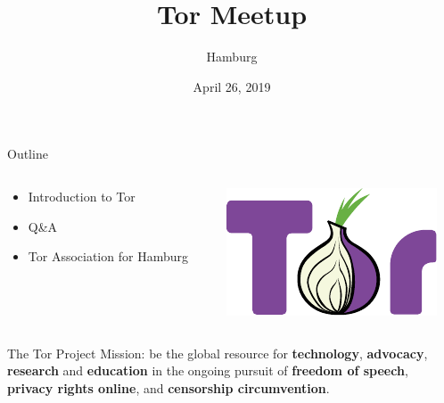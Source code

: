 \documentclass[aspectratio=169,10pt]{beamer}
\title{Tor Meetup}
\subtitle{Hamburg}
\date{April 26, 2019}
\author{}
\institute{FBI}
\begin{document}
  
  \maketitle
  
  \begin{frame}[fragile]{Outline}
    \begin{columns}
      \begin{column}{0.5\textwidth}
        \begin{itemize}
          \item Introduction to Tor
          \item Q\&A
          \item Tor Association for Hamburg
        \end{itemize}
      \end{column}
      \begin{column}{0.5\textwidth}
        \begin{center}
          \begin{overlayarea}{\textwidth}{0.5\textheight}
            \includegraphics[width=\textwidth]{img/Color.pdf}
          \end{overlayarea}
        \end{center}
      \end{column}
    \end{columns}
  \end{frame}
  
  
  \begin{frame}[fragile]{The Tor Project}
    \alert{Mission:} be the global resource for \textbf{technology}, \textbf{advocacy}, \textbf{research} and \textbf{education} in the ongoing pursuit of \textbf{freedom of speech}, \textbf{privacy rights online}, and \textbf{censorship circumvention}.
  \end{frame}
  
\end{document}
